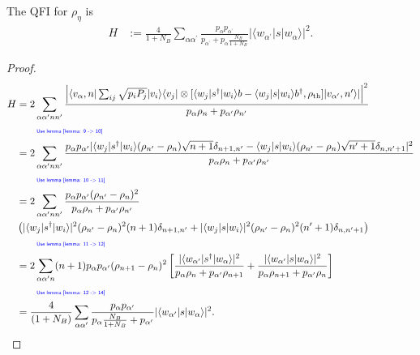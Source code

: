 \documentclass[../../note.tex]{subfiles}
\begin{document}
\begin{lemma}
    \label{lemma: qfi of returned state}
    The QFI for $\rho_{\eta}$ is
    \begin{align}
        H
        &:= \frac{4}{1+N_B} \sum_{\alpha \alpha^\prime} \frac{p_\alpha p_{\alpha^\prime}}{p_{\alpha^\prime} + p_{\alpha} \frac{N_B}{1+N_B}} \vert \langle w_{\alpha^\prime} \vert s \vert w_{\alpha} \rangle \vert^2.
    \end{align}
\end{lemma}
\begin{proof}
    \begin{align}
        H
        &= 2 \sum_{\alpha \alpha^\prime n n^\prime} \frac{\left\vert \langle v_{\alpha}, n \vert \sum_{i j} \sqrt{p_{i} P_{j}} \vert v_i \rangle \langle v_j \vert \otimes [\langle w_j \vert s^\dagger \vert w_i \rangle b - \langle w_j \vert s \vert w_i \rangle b^\dagger, \rho_{\rm th}] \vert v_{\alpha^\prime}, n^\prime \rangle \vert \right\vert^2}{p_{\alpha} \rho_n + p_{\alpha^\prime} \rho_{n^\prime}} \\
        &\qquad\text{\color{blue}{\tiny\sffamily Use lemma \ref{lemma: 9 -> 10}}} \nonumber \\
        &= 2 \sum_{\alpha \alpha^\prime n n^\prime} \frac{p_{\alpha} p_{\alpha^\prime}\vert \langle w_j \vert s^\dagger \vert w_i \rangle (\rho_{n^\prime} - \rho_n)\sqrt{n+1}\delta_{n+1, n^\prime}
        - \langle w_j \vert s \vert w_i \rangle (\rho_{n^\prime} - \rho_{n})\sqrt{n^\prime + 1}\delta_{n, n^\prime + 1}\vert^2}{p_{\alpha} \rho_n + p_{\alpha^\prime} \rho_{n^\prime}} \\
        &\qquad\text{\color{blue}{\tiny\sffamily Use lemma \ref{lemma: 10 -> 11}}} \nonumber \\
        &= 2 \sum_{\alpha \alpha^\prime n n^\prime} \frac{p_{\alpha} p_{\alpha^\prime} (\rho_{n^\prime} - \rho_n)^2}{p_{\alpha} \rho_n + p_{\alpha^\prime} \rho_{n^\prime}} \nonumber \\
        &\left(\vert \langle w_j \vert s^\dagger \vert w_i \rangle \vert^2(\rho_{n^\prime} - \rho_n)^2 (n+1) \delta_{n+1, n^\prime} + \vert \langle w_j \vert s \vert w_i \rangle \vert^2 (\rho_{n^\prime} - \rho_n)^2 (n^\prime + 1) \delta_{n, n^\prime + 1}\right) \\
        &\qquad\text{\color{blue}{\tiny\sffamily Use lemma \ref{lemma: 11 -> 12}}} \nonumber \\
        &= 2 \sum_{\alpha \alpha^\prime n} (n+1) p_{\alpha} p_{\alpha^\prime} (\rho_{n+1} - \rho_n)^2 \left[\frac{\vert \langle w_{\alpha^\prime} \vert s^\dagger \vert w_{\alpha} \rangle \vert^2}{p_{\alpha} \rho_n + p_{\alpha^\prime} \rho_{n+1}} + \frac{\vert \langle w_{\alpha^\prime} \vert s \vert w_{\alpha} \rangle \vert^2}{p_{\alpha } \rho_{n+1} + p_{\alpha^\prime} \rho_n} \right] \\
        &\qquad\text{\color{blue}{\tiny\sffamily Use lemma \ref{lemma: 12 -> 14}}} \nonumber \\
        &= \frac{4}{(1+N_B)} \sum_{\alpha \alpha^\prime} \frac{p_{\alpha} p_{\alpha^\prime}}{p_{\alpha} \frac{N_B}{1+N_B} + p_{\alpha^\prime}} \vert \langle w_{\alpha^\prime} \vert s\vert w_{\alpha} \rangle \vert^2.
    \end{align}
\end{proof}
\end{document}
